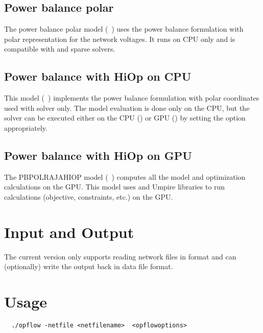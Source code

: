 \subsection{Power balance polar}
The power balance polar model ({\opflowmodel~\pbpol}) uses the power balance formulation with polar representation for the network voltages. It runs on CPU only and is compatible with \ipopt and sparse \hiop solvers.

\begin{comment}
\subsection{Power balance cartesian}
\end{comment}

\subsection{Power balance with HiOp on CPU}
This model ({\opflowmodel~\pbpolhiop}) implements the power balance formulation with polar coordinates used with \hiop solver only. The model evaluation is done only on the CPU, but the \hiop solver can be executed either on the CPU () or GPU () by setting the  option appropriately.

\subsection{Power balance with HiOp on GPU}
The PBPOLRAJAHIOP model ({\opflowmodel~\pbpolrajahiop}) computes all the model and optimization calculations on the GPU. This model uses \raja and Umpire \cite{beckingsale2019umpire} libraries to run \opflow calculations (objective, constraints, etc.) on the GPU. 

\section{Input and Output}
The current \exago version only supports reading network files in \matpower format and can (optionally) write the output back in \matpower data file format.

\section{Usage}
\begin{lstlisting}
  ./opflow -netfile <netfilename>  <opflowoptions>
\end{lstlisting}

